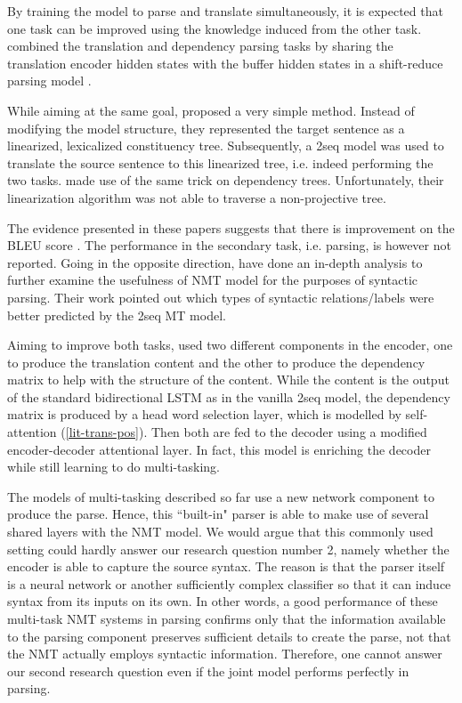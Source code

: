 By training the model to parse and translate simultaneously, it is expected that one task can be improved using the knowledge induced from the other task.
\citet{DBLP:conf/acl/EriguchiTC17} combined the translation and dependency parsing tasks by sharing the translation encoder hidden states with the buffer hidden states in a shift-reduce parsing model \cite{DBLP:conf/naacl/DyerKBS16}.

While aiming at the same goal, \citet{DBLP:conf/acl/AharoniG17a} proposed a very simple method.
Instead of modifying the model structure, they represented the target sentence as a linearized, lexicalized constituency tree.
Subsequently, a \seq2seq model was used to translate the source sentence to this linearized tree, i.e. indeed performing the two tasks.
\citet{DBLP:conf/ijcnlp/LeMYM17} made use of the same trick on dependency trees.
Unfortunately, their linearization algorithm was not able to traverse a non-projective tree.

The evidence presented in these papers suggests that there is improvement on the BLEU score \citep{BLEU}.
The performance in the secondary task, i.e. parsing, is however not reported.
Going in the opposite direction, \citet{DBLP:conf/emnlp/ShiPK16} have done an in-depth analysis to further examine the usefulness of NMT model for the purposes of syntactic parsing. Their work pointed out which types of syntactic relations/labels were better predicted by the \seq2seq MT model.

Aiming to improve both tasks, \cite{tran2018inducing} used two different components in the encoder, one to produce the translation content and the other to produce the dependency matrix to help with the structure of the content.
While the content is the output of the standard bidirectional LSTM as in the vanilla \seq2seq model, the dependency matrix is produced by a head word selection layer, which is modelled by self-attention (\cref{lit-trans-pos}).
Then both are fed to the decoder using a modified encoder-decoder attentional layer.
In fact, this model is enriching the decoder while still learning to do multi-tasking.

The models of multi-tasking described so far use a new network component to produce the parse.
Hence, this ``built-in" parser is able to make use of several shared layers with the NMT model.
We would argue that this commonly used setting could hardly answer our research question number 2, namely whether the encoder is able to capture the source syntax.
The reason is that the parser itself is a neural network or another sufficiently complex classifier so that it can induce syntax from its inputs on its own.
In other words, a good performance of these multi-task NMT systems in parsing confirms only that the information available to the parsing component preserves sufficient details to create the parse, not that the NMT actually employs syntactic information.
Therefore, one cannot answer our second research question even if the joint model performs perfectly in parsing.

